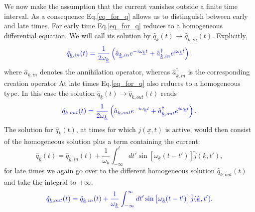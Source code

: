 \documentclass[12pt, titlepage]{article}
\begin{document}
We now make the assumption that the current vanishes outside a finite time interval. 
As a consequence Eq.\eqref{eq_for_q} allows us to distinguish between early and late times. For early time  Eq.\eqref{eq_for_q} reduces to a homogeneous differential equation. We will call its solution by $ \hat{q}_{\underline{k}}(t) \rightarrow \hat{q}_{k,in}(t) $. Explicitly, 
\begin{equation}\label{q_In_operators}
 \textcolor[RGB]{0,0,204}{
 \hat{q}_{\underline{k},in}(t) 
  =
  \dfrac{1}{2\omega_{\underline{k}}}\left(
	\hat{a}_{\underline{k},in} 
	e^{-i\omega_{\underline{k}}t}
	+
	\hat{a}^{\dagger}_{\underline{k},in}  
	e^{i\omega_{\underline{k}}t}
  \right) 
  .}
\end{equation}
where $ \hat{a}_{\underline{k},in} $ denotes the annihilation operator, whereas $ \hat{a}^{\dagger}_{\underline{k},in} $ is the corresponding creation operator
At late times Eq.\eqref{eq_for_q} also reduces to a homogeneous type. In this case the solution $ \hat{q}_{\underline{k}}(t) \rightarrow \hat{q}_{k,out}(t) $ reads
\begin{equation}\label{q_Out_operators}
 \textcolor[RGB]{0,0,204}{
 \hat{q}_{k,out}(t) 
  =
  \dfrac{1}{2\omega_{\underline{k}}}\left(
	\hat{a}_{\underline{k},out} 
	e^{-i\omega_{\underline{k}}t}
	+
	\hat{a}^{\dagger}_{\underline{k},out}  
	e^{i\omega_{\underline{k}}t}
  \right) 
  .}
\end{equation}
The solution for $ \hat{q}_{\underline{k}}(t) $, at times for which $ j(\underline{x},t) $ is active, would then consist of the homogeneous solution plus a term containing the current:
\begin{equation}
 \hat{q}_{\underline{k}}(t) 
  =
  \hat{q}_{\underline{k},in}(t) 
  +
    \dfrac{1}{\omega_{\underline{k}}}
    \int^{t}_{-\infty}
    dt'
    \sin\left[\omega_{\underline{k}}(t-t') \right] \tilde{j}(\underline{k},t'),
\end{equation}
for late times we again go over to the different homogeneous solution $ \hat{q}_{k,out}(t)  $ and take the integral to $ +\infty $.
\begin{equation}\label{q_Out_by_q_In}
 \textcolor[RGB]{0,0,204}{
\hat{q}_{\underline{k},out}(t) 
  =
  \hat{q}_{\underline{k},in}(t) 
  +
    \dfrac{1}{\omega_{\underline{k}}}
    \int^{\infty}_{-\infty}
    dt'
    \sin
    \left[
    \omega_{\underline{k}}(t-t') 
    \right]
     \tilde{j}(\underline{k},t')
  .}
\end{equation}
\end{document}

